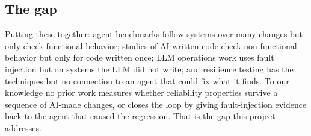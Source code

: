 \documentclass[sigconf,review]{acmart}
\begin{document}
\subsection{The gap}

Putting these together: agent benchmarks follow systems over many changes but only check functional
behavior; studies of AI-written code check non-functional behavior but only for code written once;
LLM operations work uses fault injection but on systems the LLM did not write; and resilience
testing has the techniques but no connection to an agent that could fix what it finds. To our
knowledge no prior work measures whether reliability properties survive a sequence of AI-made
changes, or closes the loop by giving fault-injection evidence back to the agent that caused the
regression. That is the gap this project addresses.






\end{document}
